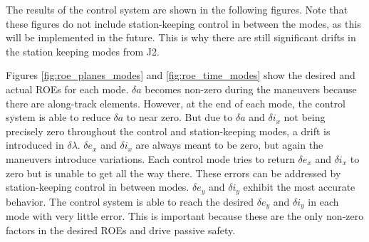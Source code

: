 The results of the control system are shown in the following figures. Note that these figures do not include station-keeping control in between the modes, as this will be implemented in the future. This is why there are still significant drifts in the station keeping modes from J2. 

Figures \ref{fig:roe_planes_modes} and \ref{fig:roe_time_modes} show the desired and actual ROEs for each mode. $\delta a$ becomes non-zero during the maneuvers because there are along-track elements. However, at the end of each mode, the control system is able to reduce $\delta a$ to near zero. But due to $\delta a$ and $\delta i_x$ not being precisely zero throughout the control and station-keeping modes, a drift is introduced in $\delta \lambda$. $\delta e_x$ and $\delta i_x$ are always meant to be zero, but again the maneuvers introduce variations. Each control mode tries to return $\delta e_x$ and $\delta i_x$ to zero but is unable to get all the way there. These errors can be addressed by station-keeping control in between modes. $\delta e_y$ and $\delta i_y$ exhibit the most accurate behavior. The control system is able to reach the desired $\delta e_y$ and $\delta i_y$ in each mode with very little error. This is important because these are the only non-zero factors in the desired ROEs and drive passive safety. 

